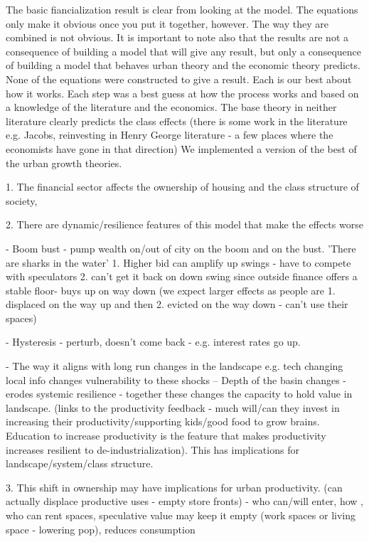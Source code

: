 The basic fiancialization result is clear from looking at the model. The equations only make it obvious once you put it together, however. The way they are combined is not obvious.  It is important to note also that the results are not a consequence of building a model that will give any result, but only a consequence of building a model that behaves urban theory and the economic theory predicts. None of the equations were constructed to give a result. Each is our best about how it works. Each step was a best guess at how the process works and based on a knowledge of the literature and the economics. The base theory in neither literature clearly predicts the class effects (there is some work in the literature e.g. Jacobs, reinvesting in Henry George literature - a few places where the economists have gone in that direction) We implemented a version of the best of the urban growth theories.


1. The financial sector affects the ownership of housing and the class structure of society, 

2. There are dynamic/resilience features of this model that make the effects worse

- Boom bust - pump wealth on/out of city on the boom and on the bust. 'There are sharks in the water' 1. Higher bid can amplify up swings - have to compete with speculators 2. can't get it back on down swing since outside finance offers a stable floor- buys up on way down (we expect larger effects as people are 1. displaced on the way up and then 2. evicted on the way down - can't use their spaces)

- Hysteresis - perturb, doesn't come back - e.g. interest rates go up.

- The way it aligns with long run changes in the landscape e.g. tech changing local info changes vulnerability to these shocks -- Depth of the basin changes - erodes systemic resilience - together these changes the capacity to hold value in landscape. (links to the productivity feedback - much will/can they invest in increasing their productivity/supporting kids/good food to grow brains. Education to increase productivity is the feature that makes productivity increases resilient to de-industrialization). This has implications for landscape/system/class structure.

3. This shift in ownership may have implications for urban productivity. (can actually displace productive uses - empty store fronts) - who can/will enter, how , who can rent spaces, speculative value may keep it empty (work spaces or living space - lowering pop), reduces consumption

